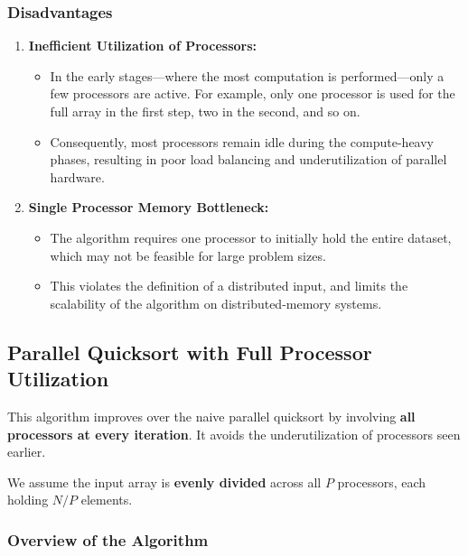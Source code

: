 \documentclass[12pt]{book}
\begin{document}
\subsubsection*{Disadvantages}

\begin{enumerate}
    \item \textbf{Inefficient Utilization of Processors:} 
    \begin{itemize}
        \item In the early stages—where the most computation is performed—only a few processors are active. For example, only one processor is used for the full array in the first step, two in the second, and so on.
        \item Consequently, most processors remain idle during the compute-heavy phases, resulting in poor load balancing and underutilization of parallel hardware.
    \end{itemize}

    \item \textbf{Single Processor Memory Bottleneck:}
    \begin{itemize}
        \item The algorithm requires one processor to initially hold the entire dataset, which may not be feasible for large problem sizes.
        \item This violates the definition of a distributed input, and limits the scalability of the algorithm on distributed-memory systems.
    \end{itemize}
\end{enumerate}

\subsection{Parallel Quicksort with Full Processor Utilization}

This algorithm improves over the naive parallel quicksort by involving \textbf{all processors at every iteration}. It avoids the underutilization of processors seen earlier.

We assume the input array is \textbf{evenly divided} across all $P$ processors, each holding $N/P$ elements.

\subsubsection*{Overview of the Algorithm}
\end{document}
